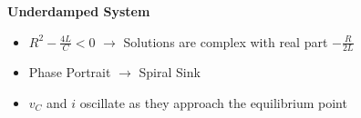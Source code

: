 \documentclass[preview]{standalone}
\begin{document}
\begin{center}
\textbf{Underdamped System}
                    \begin{itemize}
                        \item $R^2 - \frac{4L}{C} < 0$ $\rightarrow$ Solutions are complex with real part $-\frac{R}{2L}$
                        \item Phase Portrait $\rightarrow$ Spiral Sink
                        \item $v_C$ and $i$ oscillate as they approach the equilibrium point
                    \end{itemize}
\end{center}
\end{document}
